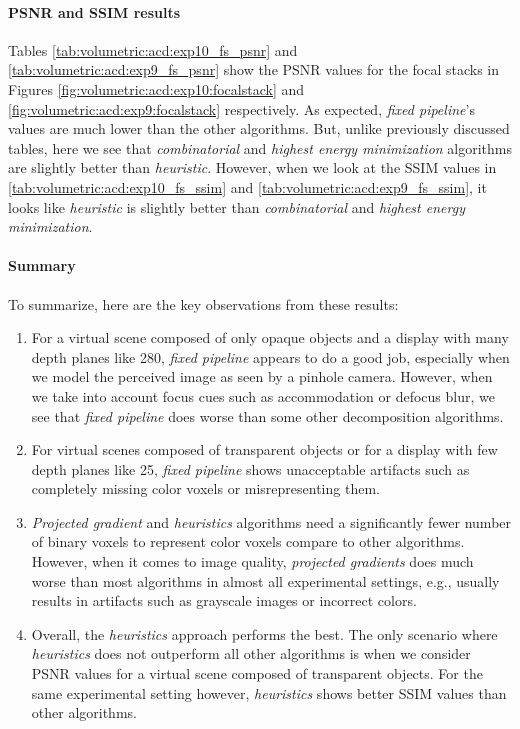 \paragraph{PSNR and SSIM results}
Tables \ref{tab:volumetric:acd:exp10_fs_psnr} and \ref{tab:volumetric:acd:exp9_fs_psnr} show the PSNR values for the focal stacks in Figures \ref{fig:volumetric:acd:exp10:focalstack} and \ref{fig:volumetric:acd:exp9:focalstack} respectively. As expected, \emph{fixed pipeline}'s values are much lower than the other algorithms. But, unlike previously discussed tables, here we see that \emph{combinatorial} and \emph{highest energy minimization} algorithms are slightly better than \emph{heuristic}. However, when we look at the SSIM values in \ref{tab:volumetric:acd:exp10_fs_ssim} and \ref{tab:volumetric:acd:exp9_fs_ssim}, it looks like \emph{heuristic} is slightly better than \emph{combinatorial} and \emph{highest energy minimization}.






\clearpage
\paragraph{Summary}
To summarize, here are the key observations from these results:
\begin{enumerate}
    \item For a virtual scene composed of only opaque objects and a display with many depth planes like 280, \emph{fixed pipeline} appears to do a good job, especially when we model the perceived image as seen by a pinhole camera. However, when we take into account focus cues such as accommodation or defocus blur, we see that \emph{fixed pipeline} does worse than some other decomposition algorithms. 
    \item For virtual scenes composed of transparent objects or for a display with few depth planes like 25, \emph{fixed pipeline} shows unacceptable artifacts such as completely missing color voxels or misrepresenting them. 
    \item \emph{Projected gradient} and \emph{heuristics} algorithms need a significantly fewer number of binary voxels to represent color voxels compare to other algorithms. However, when it comes to image quality, \emph{projected gradients} does much worse than most algorithms in almost all experimental settings, e.g., usually results in artifacts such as grayscale images or incorrect colors. 
    \item Overall, the \emph{heuristics} approach performs the best. The only scenario where \emph{heuristics} does not outperform all other algorithms is when we consider PSNR values for a virtual scene composed of transparent objects. For the same experimental setting however, \emph{heuristics} shows better SSIM values than other algorithms.
\end{enumerate}

